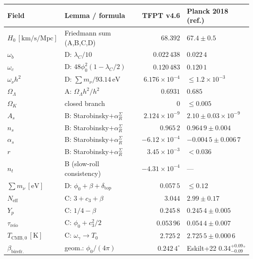 \begin{center}
\renewcommand{\arraystretch}{1.13}
\begin{tabularx}{\textwidth}{@{}p{}p{}rY@{}}
\toprule
\textbf{Field} & \textbf{Lemma / formula} & \textbf{TFPT v4.6} & \textbf{Planck 2018 (ref.)} \\
\midrule
\(H_0\,[\mathrm{km/s/Mpc}]\) & Friedmann sum (A,B,C,D)            & \(68.392\) & \(67.4\pm0.5\) \\
\(\omega_b\)                  & D: \(\lambda_C/10\)                & \(0.022\,438\) & \(0.022\,4\) \\
\(\omega_c\)                  & D: \(48\phi_0^2(1-\lambda_C/2)\)   & \(0.120\,483\) & \(0.120\,1\) \\
\(\omega_\nu h^2\)            & D: \(\sum m_\nu/93.14\,\mathrm{eV}\)& \(6.176\times10^{-4}\) & \(\le 1.2\times10^{-3}\) \\
\(\Omega_\Lambda\)            & A: \(\Omega_\Lambda h^2/h^2\)      & \(0.6931\) & \(0.685\) \\
\(\Omega_K\)                  & closed branch                       & \(0\) & \(\le 0.005\) \\
\(A_s\)                       & B: Starobinsky\(+\alpha_R^\Sigma\) & \(2.124\times10^{-9}\) & \(2.10\pm0.03\times10^{-9}\) \\
\(n_s\)                       & B: Starobinsky\(+\alpha_R^\Sigma\) & \(0.965\,2\) & \(0.964\,9\pm0.004\) \\
\(\alpha_s\)                  & B: Starobinsky\(+\alpha_R^\Sigma\) & \(-6.12\times10^{-4}\) & \(-0.004\,5\pm0.006\,7\) \\
\(r\)                         & B: Starobinsky\(+\alpha_R^\Sigma\) & \(3.45\times10^{-3}\) & \(<0.036\) \\
\(n_t\)                       & B (slow-roll consistency)         & \(-4.31\times10^{-4}\) & --- \\
\(\sum m_\nu\,[\mathrm{eV}]\) & D: \(\phi_0+\beta+\delta_{\mathrm{top}}\) & \(0.057\,5\) & \(\le 0.12\) \\
\(N_{\mathrm{eff}}\)          & C: \(3+c_3+\beta\)                  & \(3.044\) & \(2.99\pm0.17\) \\
\(Y_p\)                       & C: \(1/4 - \beta\)                  & \(0.245\,8\) & \(0.245\,4\pm0.005\) \\
\(\tau_{\mathrm{reio}}\)      & C: \(\phi_0+c_3^2/2\)              & \(0.053\,96\) & \(0.054\,4\pm0.007\) \\
\(T_{\mathrm{CMB},0}\,[\mathrm{K}]\) & C: \(\omega_\gamma\to T_0\) & \(2.725\,2\) & \(2.725\,5\pm0.000\,6\) \\
\(\beta_{\mathrm{birefr.}}\)  & geom.: \(\phi_0/(4\pi)\)            & \(0.242\,4^\circ\) & Eskilt+22 \(0.34^{+0.09}_{-0.09}{}^\circ\) \\
\bottomrule
\end{tabularx}
\end{center}

